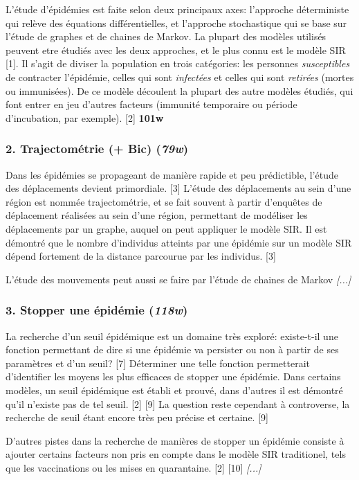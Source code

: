\documentclass{article}
\begin{document}
L'étude d'épidémies est faite selon deux principaux axes: l'approche déterministe qui relève des équations différentielles, et l'approche stochastique qui se base sur l'étude de graphes et de chaines de Markov. La plupart des modèles utilisés peuvent etre étudiés avec les deux approches, et le plus connu est le modèle SIR [1]. Il s'agit de diviser la population en trois catégories: les personnes \textit{susceptibles} de contracter l'épidémie, celles qui sont \textit{infectées} et celles qui sont \textit{retirées} (mortes ou immunisées). De ce modèle découlent la plupart des autre modèles étudiés, qui font entrer en jeu d'autres facteurs (immunité temporaire ou période d'incubation, par exemple). [2] \textbf{101w}

\subsubsection*{2. Trajectométrie (+ Bic) (\textit{79w})}

Dans les épidémies se propageant de manière rapide et peu prédictible, l'étude des déplacements devient primordiale. [3] L'étude des déplacements au sein d'une région est nommée trajectométrie, et se fait souvent à partir d'enquêtes de déplacement réalisées au sein d'une région, permettant de modéliser les déplacements par un graphe, auquel on peut appliquer le modèle SIR. Il est démontré que le nombre d'individus atteints par une épidémie sur un modèle SIR dépend fortement de la distance parcourue par les individus. [3]

L'étude des mouvements peut aussi se faire par l'étude de chaines de Markov \textit{[...]}

\subsubsection*{3. Stopper une épidémie (\textit{118w})}

La recherche d'un seuil épidémique est un domaine très exploré: existe-t-il une fonction permettant de dire si une épidémie va persister ou non à partir de ses paramètres et d'un seuil? [7] Déterminer une telle fonction permetterait d'identifier les moyens les plus efficaces de stopper une épidémie. Dans certains modèles, un seuil épidémique est établi et prouvé, dans d'autres il est démontré qu'il n'existe pas de tel seuil. [2] [9] La question reste cependant à controverse, la recherche de seuil étant encore très peu précise et certaine. [9]

D'autres pistes dans la recherche de manières de stopper un épidémie consiste à ajouter certains facteurs non pris en compte dans le modèle SIR traditionel, tels que les vaccinations ou les mises en quarantaine. [2] [10] \textit{[...]}
\end{document}
